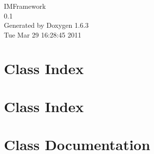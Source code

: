 \documentclass[a4paper]{book}
\begin{document}
\hypersetup{pageanchor=false}
\begin{titlepage}
\vspace*{7cm}
\begin{center}
{\Large IMFramework \\[1ex]\large 0.1 }\\
\vspace*{1cm}
{\large Generated by Doxygen 1.6.3}\\
\vspace*{0.5cm}
{\small Tue Mar 29 16:28:45 2011}\\
\end{center}
\end{titlepage}
\clearemptydoublepage
{}
\tableofcontents
\clearemptydoublepage
{}
\hypersetup{pageanchor=true}
\chapter{Class Index}

\chapter{Class Index}

\chapter{Class Documentation}




























\printindex
\end{document}
